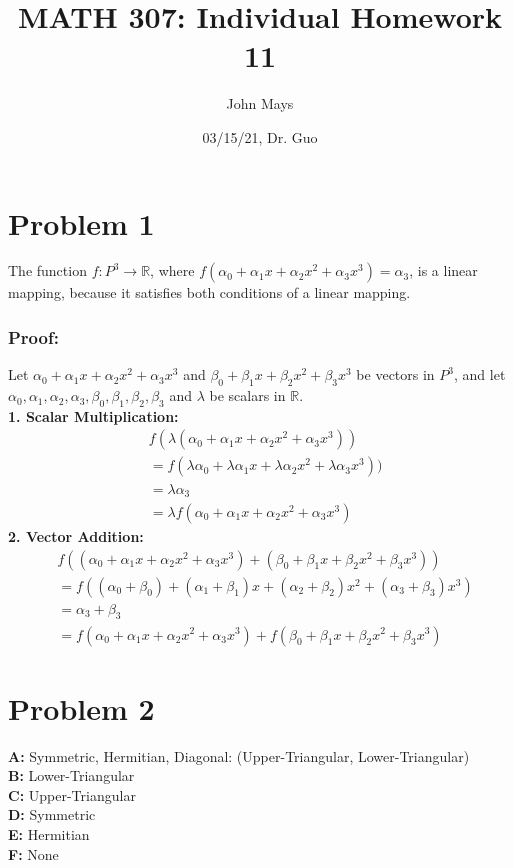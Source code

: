\documentclass[fleqn]{article}
\title{\textbf{MATH 307: Individual Homework 11}}
\author{John Mays}
\date{03/15/21, Dr. Guo}
\begin{document}
\maketitle

\section*{Problem 1}
The function $f:P^3 \rightarrow \mathbb{R}$, where $f(\alpha_0+\alpha_1x+\alpha_2x^2+\alpha_3x^3) = \alpha_3$, is a linear mapping, because it satisfies both conditions of a linear mapping.
\subsubsection*{Proof:}

Let $\alpha_0+\alpha_1x+\alpha_2x^2+\alpha_3x^3$ and $\beta_0+\beta_1x+\beta_2x^2+\beta_3x^3$ be vectors in $P^3$, and let $\alpha_0, \alpha_1, \alpha_2, \alpha_3, \beta_0, \beta_1, \beta_2, \beta_3$ and $\lambda$ be scalars in $\mathbb{R}$.\\
\textbf{1. Scalar Multiplication:}
\begin{equation*}
    \begin{split}
        & f(\lambda(\alpha_0+\alpha_1x+\alpha_2x^2+\alpha_3x^3))\\
        &= f(\lambda\alpha_0+\lambda\alpha_1x+\lambda\alpha_2x^2+\lambda\alpha_3x^3))\\
        &= \lambda \alpha_3\\ 
        &= \lambda f(\alpha_0+\alpha_1x+\alpha_2x^2+\alpha_3x^3)
    \end{split}
\end{equation*}
\textbf{2. Vector Addition:}
\begin{equation*}
    \begin{split}
        & f((\alpha_0+\alpha_1x+\alpha_2x^2+\alpha_3x^3)+(\beta_0+\beta_1x+\beta_2x^2+\beta_3x^3))\\
        &= f((\alpha_0+\beta_0)+(\alpha_1+\beta_1)x+(\alpha_2+\beta_2)x^2+(\alpha_3+\beta_3)x^3)\\
        &=\alpha_3+\beta_3\\
        &=f(\alpha_0+\alpha_1x+\alpha_2x^2+\alpha_3x^3)+f(\beta_0+\beta_1x+\beta_2x^2+\beta_3x^3)
    \end{split}
\end{equation*}

\section*{Problem 2}
\textbf{A: }Symmetric, Hermitian, Diagonal: (Upper-Triangular, Lower-Triangular)\\
\textbf{B: }Lower-Triangular\\
\textbf{C: }Upper-Triangular\\
\textbf{D: }Symmetric\\
\textbf{E: }Hermitian\\
\textbf{F: }None
\end{document}
